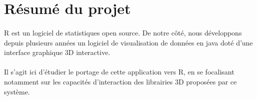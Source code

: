 \section{Résumé du projet}
\paragraph{} R est un logiciel de statistiques open source. De notre côté, nous développons depuis plusieurs années un logiciel de visualisation de données en java doté d'une interface graphique 3D interactive.
\paragraph{}
Il s'agit ici d'étudier le portage de cette application vers R, en se focalisant notamment sur les capacités d'interaction des librairies 3D proposées par ce système.
\newpage